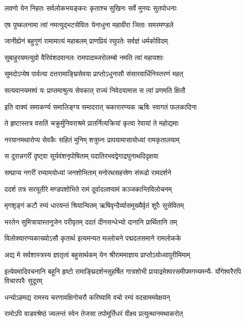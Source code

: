 \twolineshloka
{लवणो येन निहतः सर्वलोकभयङ्करः}
{कृताश्च सुखिनः सर्वे मुनयः सुतपोधनाः}%

\twolineshloka
{एष पुष्कलनामा त्वां नमत्युद्भटसेवितः}
{येनाधुना महावीरा जिताः समरमण्डले}%

\twolineshloka
{जानीह्येनं बहुगुणं रामामात्यं महाबलम्}
{प्राणप्रियं रघुपतेः सर्वज्ञं धर्मकोविदम्}%

\twolineshloka
{सुबाहुरयमत्युग्रो वैरिवंशदवानलः}
{रामपादाब्जरोलम्बो नमति त्वां महायशाः}%

\twolineshloka
{सुमदोऽप्येष पार्वत्या दत्तरामाङ्घ्रिसेवया}
{प्राप्तोऽधुनासौ संसारवार्धिनिस्तरणं महत्}%

\twolineshloka
{सत्यवानयमश्वं यः प्राप्तमाश्रुत्य सेवकात्}
{राज्यं निवेदयामास स त्वां प्रणमति क्षितौ}%

\twolineshloka
{इति वाक्यं समाकर्ण्य समालिङ्ग्य समादरात्}
{चकारारण्यक ऋषिः स्वागतं फलकादिना}%

\twolineshloka
{ते हृष्टास्तत्र वसतिं चक्रुर्मुनिवराश्रमे}
{प्रातर्नित्यक्रियां कृत्वा रेवायां ते महोद्यमाः}%

\twolineshloka
{नरयानमथारोप्य सेवकैः सहितं मुनिम्}
{शत्रुघ्नः प्रापयामासायोध्यां रामकृतालयाम्}%

\twolineshloka
{स दूरान्नगरीं दृष्ट्वा सूर्यवंशनृपोषिताम्}
{पदातिरभवद्वेगाद्रघुनाथदिदृक्षया}%

\twolineshloka
{सम्प्राप्य नगरीं रम्यामयोध्यां जनशोभिताम्}
{मनोरथसहस्रेण संरूढो रामदर्शने}%

\twolineshloka
{ददर्श तत्र सरयूतीरे मण्डपशोभिते}
{रामं दूर्वादलश्यामं कञ्जकान्तिविलोचनम्}%

\twolineshloka
{मृगशृङ्गं कटौ रम्यं धारयन्तं श्रियान्वितम्}
{ऋषिवृन्दैर्व्यासमुख्यैर्वृतं शूरैः सुसेवितम्}%

\twolineshloka
{भरतेन सुमित्रायास्तनूजेन परीवृतम्}
{ददतं दीनसन्धेभ्यो दानानि प्रार्थितानि तम्}%

\twolineshloka
{विलोक्यारण्यकाख्योऽसौ कृतार्थ इत्यमन्यत}
{मल्लोचने पद्मदलसमाने रामलोकके}%

\twolineshloka
{अद्य मे सर्वशास्त्रस्य ज्ञातृत्वं बहुसार्थकम्}
{येन श्रीराममाज्ञाय प्राप्तोऽयोध्यापुरीमिमाम्}%

\fourlineindentedshloka
{इत्येवमादिवचनानि बहूनि हृष्टो}
{रामाङ्घ्रिदर्शनसुहर्षित गात्रशोभी}
{प्रायाद्रमेश्वरसमीपमगम्यमन्यै-}
{र्योगेश्वरैरपि विचारपरैः सुदूरम्}%

\twolineshloka
{धन्योऽहमद्य रामस्य चरणावक्षिगोचरौ}
{करिष्यामि वचो रम्यं वदन्राममवेक्षयन्}%

\twolineshloka
{रामोऽपि वाडवश्रेष्ठं ज्वलन्तं स्वेन तेजसा}
{तपोमूर्तिधरं वीक्ष्य प्रत्युत्थानमथाकरोत्}%

